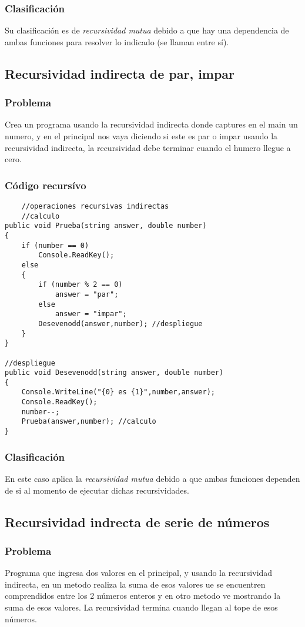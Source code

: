 \documentclass[letterpaper, 12pt]{article}
\begin{document}
\begin{justify}
            \subsubsection{Clasificación}
            Su clasificación es de \emph{recursividad mutua} debido a que hay una dependencia de ambas funciones para resolver lo indicado (se llaman entre sí).
        \subsection{Recursividad indirecta de par, impar}
            \subsubsection{Problema}
            Crea un programa usando la recursividad indirecta donde captures en el main un numero, y en el principal nos vaya diciendo si este es par o impar usando 
            la recursividad indirecta, la recursividad debe terminar cuando el humero llegue a cero.
            \subsubsection{Código recursívo}
\begin{verbatim}
    //operaciones recursivas indirectas
    //calculo
public void Prueba(string answer, double number)
{
    if (number == 0)
        Console.ReadKey();
    else
    {
        if (number % 2 == 0)
            answer = "par";
        else
            answer = "impar";
        Desevenodd(answer,number); //despliegue
    }
}

//despliegue
public void Desevenodd(string answer, double number)
{
    Console.WriteLine("{0} es {1}",number,answer);
    Console.ReadKey();
    number--;
    Prueba(answer,number); //calculo
} 
\end{verbatim}
            \subsubsection{Clasificación}
            En este caso aplica la \emph{recursividad mutua} debido a que ambas funciones dependen de si al momento de ejecutar dichas recursividades.
        \subsection{Recursividad indrecta de serie de números}
            \subsubsection{Problema}
            Programa que ingresa dos valores en el principal, y usando la recursividad indirecta, en un metodo realiza la suma de esos valores ue se encuentren
            comprendidos entre los 2 números enteros y en otro metodo ve mostrando la suma de esos valores. La recursividad termina cuando llegan al tope de esos números.

\end{justify}
\end{document}
